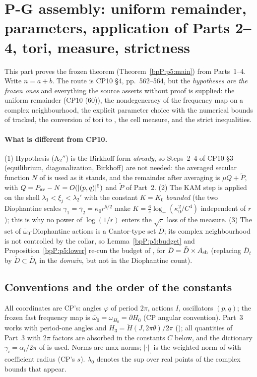 \section{P-G assembly: uniform remainder, parameters, application of Parts 2--4, tori, measure, strictness}\label{bpP:p5}
\begingroup\sloppy
\providecommand{\wn}[3]{\lvert #1\rvert_{#2,#3}}

This part proves the frozen theorem  (Theorem~\ref{bpP:p5:main}) from Parts~1--4. Write $n=a+b$. The route is CP10 \S4, pp.~562--564, but the \emph{hypotheses are the frozen ones} and everything the source asserts without proof is supplied: the uniform remainder (CP10 (60)), the nondegeneracy of the frequency map on a complex neighbourhood, the explicit parameter choice with the numerical bounds of  tracked, the conversion of tori to , the cell measure, and the strict inequalities.

\paragraph{What is different from CP10.} (1) Hypothesis (A$_2''$) is the Birkhoff form \emph{already}, so Steps~2--4 of CP10 \S3 (equilibrium, diagonalization, Birkhoff) are not needed: the averaged secular function $N$ of  is used as it stands, and the remainder after averaging is $\mu Q+\widetilde P$, with $Q=P_{\rm av}-N=O(\lvert (p,q)\rvert^5)$ and $\widetilde P$ of Part~2. (2) The KAM step is applied on the shell $\lambda_1<\xi_j<\lambda_2'$ with the constant $K=K_0$ \emph{bounded} (the two Diophantine scales $\gamma_1=\bar\gamma_2=\kappa_0 r^{5/2}$ make $K=\frac6s\log_+(\kappa_0^2/C^4)$ independent of $r$); this is why no power of $\log(1/r)$ enters the $\sqrt r$ loss of the measure. (3) The set of $\bar\omega_0$-Diophantine actions is a Cantor-type set $\check D$; its complex neighbourhood is not controlled by the collar, so Lemma~\ref{bpP:p5:budget} and Proposition~\ref{bpP:p5:lower} re-run the budget of ,  for $D=\check D\times A_{\rm sh}$ (replacing $\bar D_t$ by $\check D\subset\bar D_t$ in the \emph{domain}, but not in the Diophantine count).

\subsection{Conventions and the order of the constants}\label{bpP:p5:conv}

All coordinates are CP's: angles $\varphi$ of period $2\pi$, actions $I$, oscillators $(p,q)$; the frozen fast frequency map is $\bar\omega_0=\omega_{H_0}=\partial H_0$ (CP angular convention). Part~3 works with period-one angles and $H_3=\tilde H(J,2\pi\theta)/2\pi$ (); all quantities of Part~3 with $2\pi$ factors are absorbed in the constants $C$ below, and the dictionary $\gamma_i=\alpha_i/2\pi$ of  is used. Norms are max norms; $\wn{\cdot}{}{}$ is the weighted norm of  with coefficient radius (CP's $s$). $\lambda_0$ denotes the sup over real points of the complex bounds that appear.

